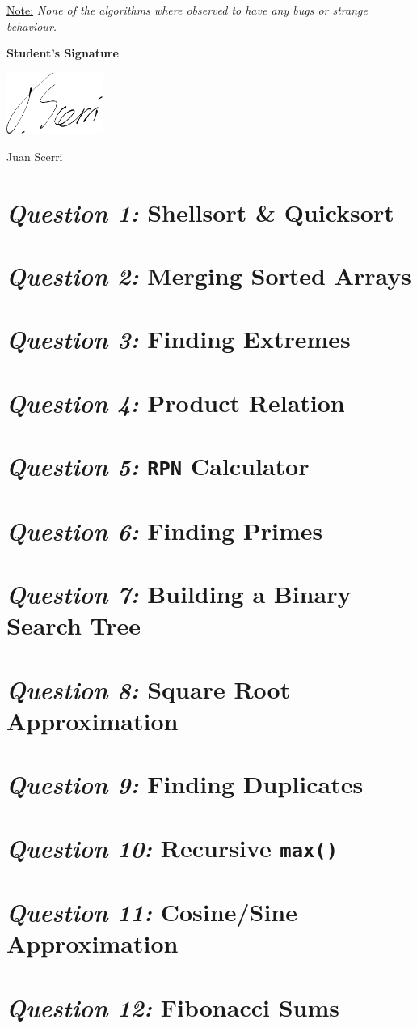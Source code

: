 \documentclass[12pt]{article}
\begin{document}
\underline{Note:} \textit{None of the algorithms where
observed to have any bugs or strange behaviour.}

\vfill

\textbf{Student's Signature} \medskip

\underline{\includegraphics[height=2cm]{sig}} \medskip

Juan Scerri

\section{\textit{Question 1:} Shellsort \& Quicksort}
\section{\textit{Question 2:} Merging Sorted Arrays}
\section{\textit{Question 3:} Finding Extremes}
\section{\textit{Question 4:} Product Relation}
\section{\textit{Question 5:} \texttt{RPN} Calculator}
\section{\textit{Question 6:} Finding Primes}
\section{\textit{Question 7:} Building a Binary Search Tree}
\section{\textit{Question 8:} Square Root Approximation}
\section{\textit{Question 9:} Finding Duplicates}
\section{\textit{Question 10:} Recursive \texttt{max()}}
\section{\textit{Question 11:} Cosine/Sine Approximation}
\section{\textit{Question 12:} Fibonacci Sums}
\end{document}
